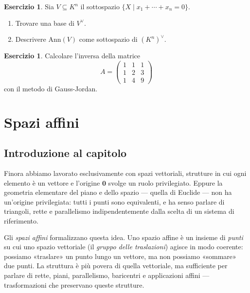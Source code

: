 \documentclass[11pt, a4paper]{book}
\theoremstyle{definition}
\newtheorem{esercizio}[definizione]{Esercizio}
\theoremstyle{plain}
\theoremstyle{remark}
\newcommand{\Ann}{\mathrm{Ann}}
\begin{document}
\begin{esercizio}
Sia $V \subseteq K^n$ il sottospazio $\{X \mid x_1 + \cdots + x_n = 0\}$.
\begin{enumerate}
  \item Trovare una base di $V^\vee$.
  \item Descrivere $\Ann(V)$ come sottospazio di $(K^n)^\vee$.
\end{enumerate}
\end{esercizio}

\begin{esercizio}
Calcolare l'inversa della matrice
\[
  A = \begin{pmatrix} 1 & 1 & 1 \\ 1 & 2 & 3 \\ 1 & 4 & 9 \end{pmatrix}
\]
con il metodo di Gauss-Jordan.
\end{esercizio}



\chapter{Spazi affini}
\label{cap:affini}

\section*{Introduzione al capitolo}

Finora abbiamo lavorato esclusivamente con spazi vettoriali, strutture in cui ogni elemento è un vettore e l'origine $\mathbf{0}$ svolge un ruolo privilegiato. Eppure la geometria elementare del piano e dello spazio --- quella di Euclide --- non ha un'origine privilegiata: tutti i punti sono equivalenti, e ha senso parlare di triangoli, rette e parallelismo indipendentemente dalla scelta di un sistema di riferimento.

Gli \emph{spazi affini} formalizzano questa idea. Uno spazio affine è un insieme di \emph{punti} su cui uno spazio vettoriale (il \emph{gruppo delle traslazioni}) agisce in modo coerente: possiamo «traslare» un punto lungo un vettore, ma non possiamo «sommare» due punti. La struttura è più povera di quella vettoriale, ma sufficiente per parlare di rette, piani, parallelismo, baricentri e applicazioni affini --- trasformazioni che preservano queste strutture.
\end{document}
